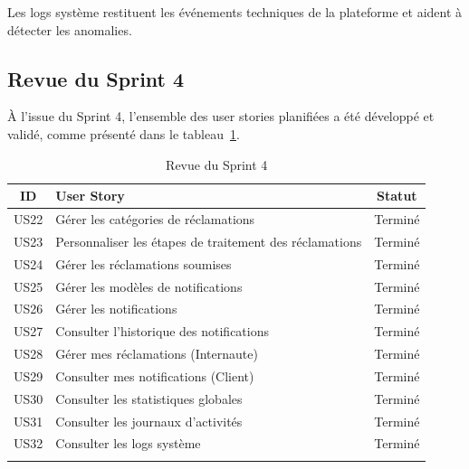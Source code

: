 Les logs système restituent les événements techniques de la plateforme et aident à détecter les anomalies.


\subsection{Revue du Sprint 4}
 

À l'issue du Sprint 4, l'ensemble des user stories planifiées a été développé et validé, comme présenté dans le tableau~\ref{tab:revue-sprint4}.

\begin{longtable}{|c|p{9cm}|c|}
\hline
\rowcolor{orange!30}
\textbf{ID} & \textbf{User Story} & \textbf{Statut} \\ \hline
US22 & Gérer les catégories de réclamations & \textcolor{green!60!black}{Terminé} \\ \hline
US23 & Personnaliser les étapes de traitement des réclamations & \textcolor{green!60!black}{Terminé} \\ \hline
US24 & Gérer les réclamations soumises & \textcolor{green!60!black}{Terminé} \\ \hline
US25 & Gérer les modèles de notifications & \textcolor{green!60!black}{Terminé} \\ \hline
US26 & Gérer les notifications & \textcolor{green!60!black}{Terminé} \\ \hline
US27 & Consulter l'historique des notifications & \textcolor{green!60!black}{Terminé} \\ \hline
US28 & Gérer mes réclamations (Internaute) & \textcolor{green!60!black}{Terminé} \\ \hline
US29 & Consulter mes notifications (Client) & \textcolor{green!60!black}{Terminé} \\ \hline
US30 & Consulter les statistiques globales & \textcolor{green!60!black}{Terminé} \\ \hline
US31 & Consulter les journaux d'activités & \textcolor{green!60!black}{Terminé} \\ \hline
US32 & Consulter les logs système & \textcolor{green!60!black}{Terminé} \\ \hline
\caption{Revue du Sprint 4}
\label{tab:revue-sprint4}
\end{longtable}

